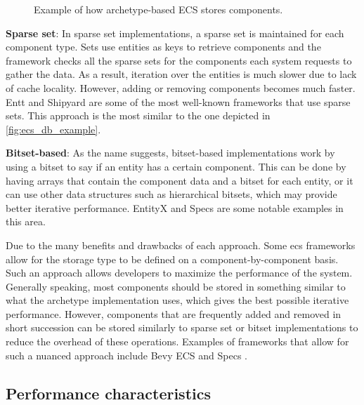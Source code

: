 \documentclass[twoside, 11pt]{article}
\begin{document}
\begin{figure}
  \centering
  
  \caption[Example of how archetype-based ECS stores components]{Example of how archetype-based ECS stores components.}
  \label{fig:ecs_archetype_example}
\end{figure}

\textbf{Sparse set}: In sparse set implementations, a sparse set is maintained for each component type. Sets use entities as keys to retrieve components and the framework checks all the sparse sets for the components each system requests to gather the data. As a result, iteration over the entities is much slower due to lack of cache locality. However, adding or removing components becomes much faster. Entt \cite{entt} and Shipyard \cite{shipyard} are some of the most well-known frameworks that use sparse sets. This approach is the most similar to the one depicted in \autoref{fig:ecs_db_example}.

\textbf{Bitset-based}: As the name suggests, bitset-based implementations work by using a bitset to say if an entity has a certain component. This can be done by having arrays that contain the component data and a bitset for each entity, or it can use other data structures such as hierarchical bitsets, which may provide better iterative performance. EntityX \cite{entityx} and Specs \cite{specs} are some notable examples in this area.

Due to the many benefits and drawbacks of each approach. Some \gls{ecs} frameworks allow for the storage type to be defined on a component-by-component basis. Such an approach allows developers to maximize the performance of the system. Generally speaking, most components should be stored in something similar to what the archetype implementation uses, which gives the best possible iterative performance. However, components that are frequently added and removed in short succession can be stored similarly to sparse set or bitset implementations to reduce the overhead of these operations. Examples of frameworks that allow for such a nuanced approach include Bevy ECS \cite{bevy} and Specs \cite{specs}.

\subsection{Performance characteristics}
\end{document}
